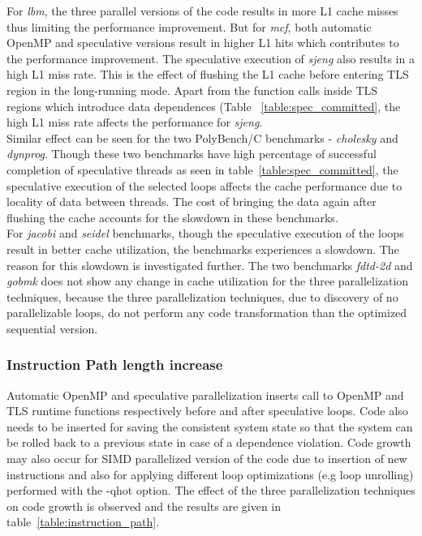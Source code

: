 \documentclass[10pt]{report}          %
\begin{document}
For \textit{lbm}, the three parallel versions of the code results in more L1 cache misses thus limiting the performance improvement.  But for \textit{mcf}, both automatic OpenMP and speculative versions result in higher L1 hits which contributes to the performance improvement.  The speculative execution of \textit{sjeng} also results in a high L1 miss rate.  This is the effect of flushing the L1 cache before entering TLS region in the long-running mode.  Apart from the function calls inside TLS regions which introduce data dependences (Table ~\ref{table:spec_committed}, the high L1 miss rate affects the performance for \textit{sjeng}.\\
Similar effect can be seen for the two PolyBench/C benchmarks - \textit{cholesky} and \textit{dynprog}.  Though these two benchmarks have high percentage of successful completion of speculative threads as seen in table~\ref{table:spec_committed}, the speculative execution of the selected loops affects the cache performance due to locality of data between threads.  The cost of bringing the data again after flushing the cache accounts for the slowdown in these benchmarks. \\
For \textit{jacobi} and \textit{seidel} benchmarks, though the speculative execution of the loops result in better cache utilization, the benchmarks experiences a slowdown.  The reason for this slowdown is investigated further.  The two benchmarks \textit{fdtd-2d} and \textit{gobmk} does not show any change in cache utilization for the three parallelization techniques, because the three parallelization techniques, due to discovery of no parallelizable loops, do not perform any code transformation than the optimized sequential version.

\subsubsection{Instruction Path length increase}

Automatic OpenMP and speculative parallelization inserts call to OpenMP and TLS runtime functions respectively before and after speculative loops.  Code also needs to be inserted for saving the consistent system state so that the system can be rolled back to a previous state in case of a dependence violation.  Code growth may also occur for SIMD parallelized version of the code due to insertion of new instructions and also for applying different loop optimizations (e.g loop unrolling) performed with the -qhot option.  The effect of the three parallelization techniques on code growth is observed and the results are given in table~\ref{table:instruction_path}.\\
\end{document}
